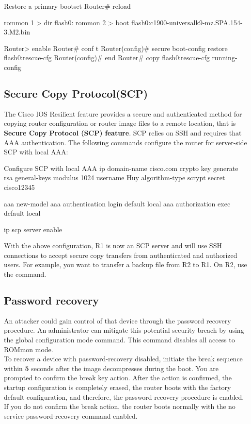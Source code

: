 \begin{sexylisting}{Restore a primary bootset}
Router# reload

rommon 1 > dir flash0:
rommon 2 > boot flash0:c1900-universalk9-mz.SPA.154-3.M2.bin

Router> enable
Router# conf t
Router(config)# secure boot-config restore flash0:rescue-cfg
Router(config)# end
Router# copy flash0:rescue-cfg running-config
\end{sexylisting}

\subsection{Secure Copy Protocol(SCP)}

The Cisco IOS Resilient feature provides a  secure and authenticated method for copying router configuration or router image files to a remote location, that is \textbf{Secure Copy Protocol (SCP) feature}. SCP relies on SSH and requires that AAA authentication.  The following commands configure the router for server-side SCP with local AAA:

\begin{sexylisting}{Configure SCP with local AAA}
ip domain-name cisco.com
crypto key generate rsa general-keys modulus 1024
username Huy algorithm-type scrypt secret cisco12345

aaa new-model 
aaa authentication login default local 
aaa authorization exec default local

ip scp server enable
\end{sexylisting}

With the above configuration, R1 is now an SCP server and will use SSH connections to accept secure copy transfers from authenticated and authorized users. For example, you want to transfer a backup file from R2 to R1. On R2, use the  command.

\subsection{Password recovery}

An attacker could gain control of that device through the password recovery procedure. An administrator can mitigate this potential security breach by using the  global configuration mode command. This command disables all access to ROMmon mode. \\

To recover a device with password-recovery disabled, initiate the break sequence within \textbf{5} seconds after the image decompresses during the boot. You are prompted to confirm the break key action. After the action is confirmed, the startup configuration is completely erased, the router boots with the factory default configuration, and therefore, the password recovery procedure is enabled. If you do not confirm the break action, the router boots normally with the no service password-recovery command enabled.

